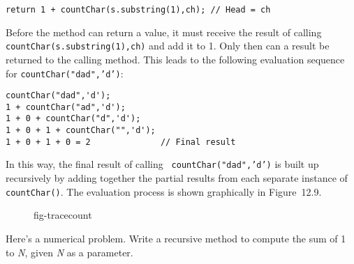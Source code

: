 \begin{jjjlisting}
\begin{lstlisting}
return 1 + countChar(s.substring(1),ch); // Head = ch
\end{lstlisting}
\end{jjjlisting}

\noindent Before the method can return a value, it must receive the
result of calling {\tt countChar(s.substring(1),ch)} and add it to
1. Only then can a result be returned to the calling method.   This
leads to the following evaluation sequence for
{\tt countChar("dad",'d')}:

\begin{jjjlisting}
\begin{lstlisting}
countChar("dad",'d');
1 + countChar("ad",'d');
1 + 0 + countChar("d",'d');
1 + 0 + 1 + countChar("",'d');
1 + 0 + 1 + 0 = 2              // Final result
\end{lstlisting}
\end{jjjlisting}

\noindent In this way, the final result of calling {\tt
countChar("dad",'d')} is built up recursively by adding together the
partial results from each separate instance of {\tt countChar()}. The
evaluation process is shown graphically in Figure~12.9.

\begin{figure}[htb]
 {fig-tracecount}
\end{figure}



\label{self-study-exercise}
\begin{SSTUDY}

\item  Here's a numerical problem.  Write a recursive method to compute
the sum of 1 to {\it N}, given {\it N} as a parameter.

\end{SSTUDY}

